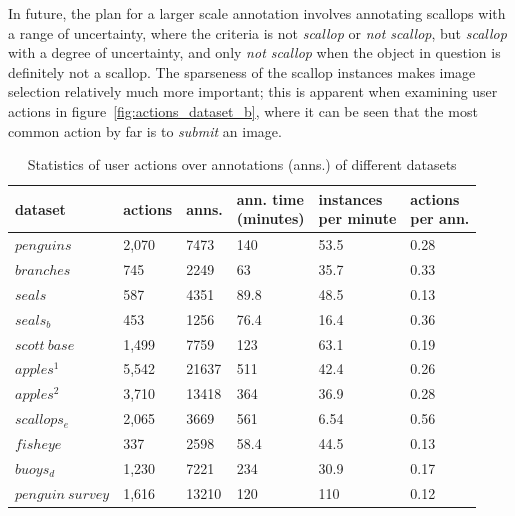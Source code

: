 In future, the plan for a larger scale annotation involves annotating scallops with a range of uncertainty, where the criteria is not \emph{scallop} or \emph{not scallop}, but \emph{scallop} with a degree of uncertainty, and only \emph{not scallop} when the object in question is definitely not a scallop. The sparseness of the scallop instances makes image selection relatively much more important; this is apparent when examining user actions in figure~\ref{fig:actions_dataset_b}, where it can be seen that the most common action by far is to \emph{submit} an image.



\begin{table}[]
\centering
\caption{ Statistics of user actions over annotations (anns.) of different datasets }
\label{tab:annotation_table}
\begin{tabular}{llllll}
dataset           & actions & anns. & \shortstack {ann. time \\ (minutes)} & \shortstack{instances \\ per minute} & \shortstack{actions \\ per ann.} \\
\toprule
$penguins$        & 2,070   & 7473        & 140                       & 53.5                 & 0.28                   \\
$branches$        & 745     & 2249        & 63                        & 35.7                 & 0.33                   \\
$seals$           & 587     & 4351        & 89.8                      & 48.5                 & 0.13                   \\
$seals_b$         & 453     & 1256        & 76.4                      & 16.4                 & 0.36                   \\
$scott\:base$     & 1,499   & 7759        & 123                       & 63.1                 & 0.19                   \\
$apples^1$        & 5,542   & 21637       & 511                       & 42.4                 & 0.26                   \\
$apples^2$        & 3,710   & 13418       & 364                       & 36.9                 & 0.28                   \\
$scallops_e$      & 2,065   & 3669        & 561                       & 6.54                 & 0.56                   \\
$fisheye$         & 337     & 2598        & 58.4                      & 44.5                 & 0.13                   \\
$buoys_d$         & 1,230   & 7221        & 234                       & 30.9                 & 0.17                   \\
$penguin\:survey$ & 1,616   & 13210       & 120                       & 110                  & 0.12                  \\
\bottomrule
\end{tabular}
\end{table}



